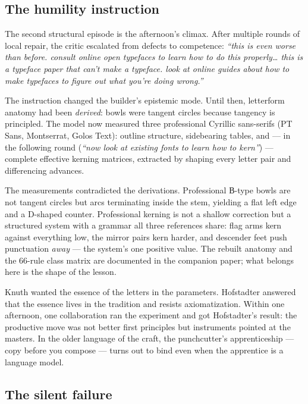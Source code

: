 \documentclass[11pt]{article}
\newcommand{\cz}[1]{{\chu #1}}
\begin{document}
\subsection{The humility instruction}\label{sec:masters}

The second structural episode is the afternoon's climax. After multiple rounds of local repair, the critic escalated from defects to competence: \emph{``this is even worse than before. consult online open typefaces to learn how to do this properly\ldots{} this is a typeface paper that can't make a typeface. look at online guides about how to make typefaces to figure out what you're doing wrong.''}

The instruction changed the builder's epistemic mode. Until then, letterform anatomy had been \emph{derived}: bowls were tangent circles because tangency is principled. The model now measured three professional Cyrillic sans-serifs (PT Sans, Montserrat, Golos Text): outline structure, sidebearing tables, and — in the following round (\emph{``now look at existing fonts to learn how to kern''}) — complete effective kerning matrices, extracted by shaping every letter pair and differencing advances.

The measurements contradicted the derivations. Professional \cz{В}-type bowls are not tangent circles but arcs terminating inside the stem, yielding a flat left edge and a D-shaped counter. Professional kerning is not a shallow correction but a structured system with a grammar all three references share: flag arms kern against everything low, the mirror pairs kern harder, and descender feet push punctuation \emph{away} — the system's one positive value. The rebuilt anatomy and the 66-rule class matrix are documented in the companion paper; what belongs here is the shape of the lesson.

Knuth wanted the essence of the letters in the parameters. Hofstadter answered that the essence lives in the tradition and resists axiomatization. Within one afternoon, one collaboration ran the experiment and got Hofstadter's result: the productive move was not better first principles but instruments pointed at the masters. In the older language of the craft, the punchcutter's apprenticeship — copy before you compose — turns out to bind even when the apprentice is a language model.

\subsection{The silent failure}
\end{document}
